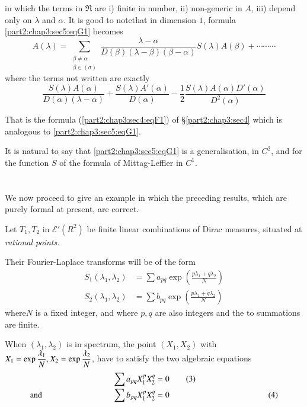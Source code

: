 \label{page100}
in which the terms in $\mathfrak{R}$ are i) finite in number, ii)
non-generic in $A$, iii) depend only on $\lambda$ and $\alpha$. It is
good to note\pageoriginale that in dimension $1$,
formula \ref{part2:chap3:sec5:eqG1}  becomes 
$$
A(\lambda) = \sum_{\substack{\beta \neq \alpha\\ \beta \in (\sigma)}}
\frac{\lambda - \alpha} {D(\beta) (\lambda - \beta)(\beta - \alpha )}
S(\lambda ) A (\beta ) + \cdots \cdots \cdots 
$$
where the terms not written are exactly
$$
\frac{S(\lambda ) A (\alpha )} {D(\alpha ) (\lambda - \alpha )} +
\frac{S(\lambda ) A' (\alpha )} {D(\alpha )} - \frac{1}{2}
\frac{S(\lambda ) A (\alpha ) D' (\alpha )} {D^2(\alpha )} 
$$

That is the formula (\ref{part2:chap3:sec4:eqF1}) of
\S \ref{part2:chap3:sec4} which is analogous to
\ref{part2:chap3:sec5:eqG1}. 

It is natural to say that \ref{part2:chap3:sec5:eqG1} is a generalisation, in
$C^2$, and for the function $S$ of the formula of Mittag-Leffler in
$C^1$. 

\section{}\label{part2:chap3:sec6}%

We now proceed to give an example in which the preceding results,
which are purely formal at present, are correct. 

Let $T_1, T_2$ in $\mathscr{E}' (R^2)$ be finite linear combinations
of Dirac measures, situated at \textit{rational points}. 

Their Fourier-Laplace transforms will be of the form
\begin{align*}
  S_1(\lambda_1,  \lambda_2) & = \sum a_{pq} \exp \left(\frac{p \lambda_1 +
    q \lambda_2}{N}\right) \tag{1}\label{part2:chap3:sec6:eq1}\\ 
  S_2(\lambda_1,  \lambda_2) & = \sum b_{pq} \exp \left(\frac{p \lambda_1 +
    q \lambda_2}{N}\right) \tag{2}\label{part2:chap3:sec6:eq2} 
\end{align*}
where\pageoriginale $N$ is a fixed integer, and where $p, q$ are also integers and
the to summations are finite. 

When $(\lambda_1,  \lambda_2)$ is in spectrum, the point $(X_1,  X_2)$
with $X_1 = \exp \dfrac{\lambda_1}{N},\break X_2 = \exp
\dfrac{\lambda_2}{N}$, have to satisfy the two algebraic equations 
\begin{align*}
  \sum a_{pq} X^p_1 X^q_2 & = 0 \tag{3}\label{part2:chap3:sec6:eq3}\\
  \text{and} \hspace{3cm}\sum b_{pq} X^p_1 X^q_2 & =
  0  \hspace{3.5cm}\tag{4}\label{part2:chap3:sec6:eq4} 
\end{align*}

